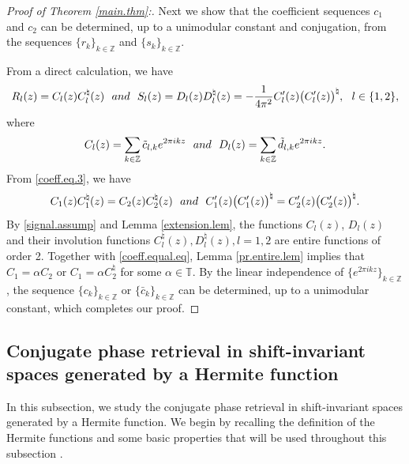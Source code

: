 \documentclass[11pt,oneside,reqno]{amsart}
\numberwithin{equation}{section}
\def\Z{ {\mathbb Z} }
\def\T{ {\mathbb T} }
\begin{document}
\begin{proof}[ Proof of Theorem \ref{main.thm}:]
   Next we show that   the coefficient sequences $c_1$ and  $c_2$ can be determined, up to a unimodular constant and conjugation, from the sequences $\{r_k\}_{k\in\Z}$ and $\{s_k\}_{k \in\Z}$.

From a direct calculation, we have
\begin{equation*}%
R_l(z)=C_l(z)C_l^\natural(z) \ {\rm  \ and \ } \ S_l(z)=D_l(z)D_l^\natural(z)=-\frac{1}{4\pi^2}C_l'(z)\big(C_l'(z)\big)^\natural,  \ \ l\in \{1, 2\}, 
\end{equation*}
where \begin{equation*}
C_l(z)=\sum_{k\in\Z} \tilde c_{l, k}e^{2\pi ikz} \ {\rm \ and \ } \ D_l(z)=\sum_{k\in\Z} \tilde d_{l, k}e^{2\pi ikz}.
\end{equation*}
From \eqref{coeff.eq.3}, we have
\begin{equation}\label{coeff.equal.eq}
C_1(z)C_1^\natural(z)=C_2(z)C_2^\natural(z) \ {\rm  \ and \ } \ C_1'(z)\big(C_1'(z)\big)^\natural=C_2'(z)\big(C_2'(z)\big)^\natural. 
\end{equation}
   By \eqref{signal.assump} and Lemma \ref{extension.lem}, the functions $C_l(z)$, $D_l(z)$ and  their involution functions $C_l^\natural(z), D_l^\natural(z), l=1,2$ 
  are entire functions of order 2. 
Together with \eqref{coeff.equal.eq},  Lemma \ref{pr.entire.lem} implies that  $C_1=\alpha C_2$ or $C_1=\alpha C_2^\natural$ for some $\alpha \in \T$.  By the linear independence of $\{e^{2\pi i  kz}\}_{k\in \Z}$,  the sequence $\{c_k\}_{k\in \Z}$ or $\{\bar{c}_k\}_{k\in \Z}$ can be determined, up to a unimodular constant, which completes our proof.
\end{proof}



\subsection{Conjugate phase retrieval in shift-invariant spaces generated by a Hermite function}

In this subsection, we study the conjugate phase retrieval in  shift-invariant spaces  generated by a Hermite function. We begin by recalling the definition of the Hermite functions and some basic
properties that will be used throughout this subsection \cite{abreu2014, cohenbook, szego75}.
\end{document}
